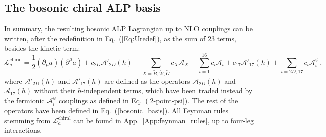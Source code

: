 \documentclass[11pt]{article}
\newcommand{\A}{\mathcal{A}}
\newcommand{\beq}{\begin{equation}}
\newcommand{\eeq}{\end{equation}}
\renewcommand{\[}{\begin{equation}}
\renewcommand{\]}{\end{equation}}
\newcommand{\LL}{\mathscr{L}}
\begin{document}
\subsection{The  bosonic  chiral ALP basis}

In summary, the resulting bosonic ALP Lagrangian up to NLO couplings can  be written, after the redefinition in Eq.~(\ref{Eq:Uredef}), 
as the sum of 23 terms, besides the kinetic term:
\beq
\LL_a^\text{chiral}=\frac{1}{2}(\partial_\mu a)(\partial^\mu a)+c_{2D}\A'_{2D}(h)+\sum_{X=\tilde{B},\tilde{W},\tilde{G}}c_X \A_X + 
\sum_{i=1}^{16}c_i\A_i+c_{17}\A'_{17}(h)+\sum_{i=2D,17}c_{i}\A_i^{\psi}\,,
\label{Complete}
\eeq
where $\A'_{2D}(h)$ and $\A'_{17}(h)$ are defined as the  operators $\A_{2D}(h)$ and $\A_{17}(h)$ without their $h$-independent 
terms, which have been traded instead by
the fermionic $\A_i^{\psi}$ couplings as defined in Eq.~(\ref{2-point-psi}). 
The rest of the operators have been defined in Eq.~(\ref{bosonic_basis}). All Feynman rules  
stemming from $\LL_a^\text{chiral}$ can be found in App.~\ref{App:feynman_rules}, up to four-leg interactions. 
 
\end{document}
